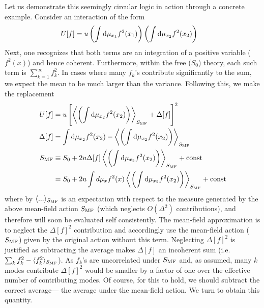 Let us demonstrate this seemingly circular logic in action through a concrete example. Consider an interaction of the form 
\begin{align}
U[f] &= u\left(\int \text{d}\mu_{x_1} f^2(x_1)\right)\left(\int \text{d}\mu_{x_2} f^2(x_2)\right) 
\end{align}
Next, one recognizes that both terms are an integration of a positive variable ($f^2(x)$) and hence coherent. Furthermore, within the free ($S_0$) theory, each such term is $\sum_{k=1}^{\infty}
f_k^2$. In cases where many $f_k$'s contribute significantly to the sum, we expect the mean to be much larger than the variance. Following this, we make the replacement 
\begin{align}
U[f] &= u\left[\left\langle \left(\int \text{d}\mu_{x_2} f^2(x_2)\right) \right\rangle_{S_{\text{MF}}}+\Delta[f]\right]^2 \\ \nonumber 
\Delta[f] &= \int \text{d}\mu_{x_2} f^2(x_2)-\left\langle \left(\int \text{d}\mu_{x_2} f^2(x_2)\right) \right\rangle_{S_{\text{MF}}}
\\ \nonumber 
S_{\text{MF}} &\equiv S_0 + 2 u \Delta[f]\left\langle \left(\int \text{d}\mu_{x_2} f^2(x_2)\right) \right\rangle_{S_{\text{MF}}} + \text{const}  \\ \nonumber 
&= S_0 + 2 u \int d \mu_x f^2(x)\left\langle \left(\int \text{d}\mu_{x_2} f^2(x_2)\right) \right\rangle_{S_{\text{MF}}} + \text{const} 
\end{align}
where by $\langle ...\rangle_{S_{\text{MF}}}$ is an expectation with respect to the measure generated by the above mean-field action $S_{\text{MF}}$ (which neglects $O(\Delta^2)$ contributions), and therefore will soon be evaluated self consistently.  The mean-field approximation is to neglect the $\Delta[f]^2$ contribution and accordingly use the mean-field action ($S_{\text{MF}}$) given by the original action without this term. Neglecting $\Delta[f]^2$ is justified as subtracting the average makes $\Delta[f]$ an incoherent sum (i.e. $\sum_k f_k^2 -\langle f^2_k \rangle_{S_{\text{MF}}}$). As $f_k$'s are uncorrelated under $S_{\text{MF}}$ and, as assumed, many $k$ modes contribute $\Delta[f]^2$ would be smaller by a factor of one over the effective number of contributing modes. Of course, for this to hold, we should subtract the correct average--- the average under the mean-field action. We turn to obtain this quantity. 

